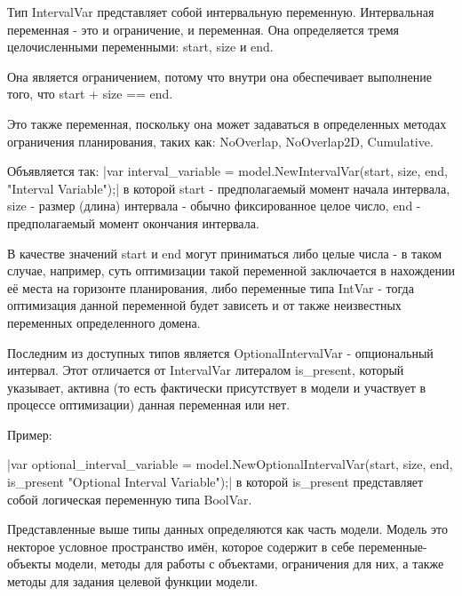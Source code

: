 Тип IntervalVar представляет собой интервальную переменную. Интервальная переменная - это и ограничение, и переменная. Она определяется тремя целочисленными переменными: start, size и end.

Она является ограничением, потому что внутри она обеспечивает выполнение того, что start + size == end.

Это также переменная, поскольку она может задаваться в определенных методах ограничения планирования, таких как: NoOverlap, NoOverlap2D, Cumulative.

Объявляется так:
|var interval_variable = model.NewIntervalVar(start, size, end, "Interval Variable");|
в которой start - предполагаемый момент начала интервала, size - размер (длина) интервала - обычно фиксированное целое число, end - предполагаемый момент окончания интервала. 

В качестве значений start и end могут приниматься либо целые числа - в таком случае, например, суть оптимизации такой переменной заключается в нахождении её места на горизонте планирования, либо переменные типа IntVar - тогда оптимизация данной переменной будет зависеть и от также неизвестных переменных определенного домена.

Последним из доступных типов является OptionalIntervalVar - опциональный интервал. Этот отличается от IntervalVar литералом is\_present, который указывает, активна (то есть фактически присутствует в модели и участвует в процессе оптимизации) данная переменная или нет.

Пример:

|var optional_interval_variable = model.NewOptionalIntervalVar(start, size, end, is_present "Optional Interval Variable");|
в которой is\_present представляет собой логическая переменную типа BoolVar.

Представленные выше типы данных определяются как часть модели. Модель это некторое условное пространство имён, которое содержит в себе переменные-объекты модели, методы для работы с объектами, ограничения для них, а также методы для задания целевой функции модели.

